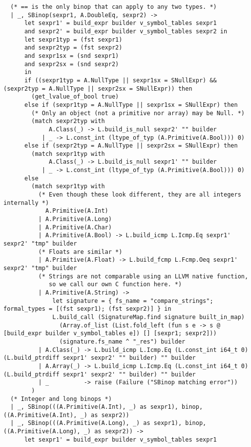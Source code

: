\documentclass{article}
\begin{document}
\begin{verbatim}
  (* == is the only binop that can apply to any two types. *)
  | _, SBinop(sexpr1, A.DoubleEq, sexpr2) ->
      let sexpr1' = build_expr builder v_symbol_tables sexpr1
      and sexpr2' = build_expr builder v_symbol_tables sexpr2 in
      let sexpr1typ = (fst sexpr1)
      and sexpr2typ = (fst sexpr2)
      and sexpr1sx = (snd sexpr1)
      and sexpr2sx = (snd sexpr2)
      in
      if ((sexpr1typ = A.NullType || sexpr1sx = SNullExpr) && (sexpr2typ = A.NullType || sexpr2sx = SNullExpr)) then
        (get_lvalue_of_bool true)
      else if (sexpr1typ = A.NullType || sexpr1sx = SNullExpr) then
        (* Only an object (not a primitive nor array) may be Null. *)
        (match sexpr2typ with
             A.Class(_) -> L.build_is_null sexpr2' "" builder
           | _ -> L.const_int (ltype_of_typ (A.Primitive(A.Bool))) 0)
      else if (sexpr2typ = A.NullType || sexpr2sx = SNullExpr) then
        (match sexpr1typ with
             A.Class(_) -> L.build_is_null sexpr1' "" builder
           | _ -> L.const_int (ltype_of_typ (A.Primitive(A.Bool))) 0)
      else
        (match sexpr1typ with
          (* Even though these look different, they are all integers internally *)
            A.Primitive(A.Int)
          | A.Primitive(A.Long)
          | A.Primitive(A.Char)
          | A.Primitive(A.Bool) -> L.build_icmp L.Icmp.Eq sexpr1' sexpr2' "tmp" builder
          (* Floats are similar *)
          | A.Primitive(A.Float) -> L.build_fcmp L.Fcmp.Oeq sexpr1' sexpr2' "tmp" builder
          (* Strings are not comparable using an LLVM native function,
             so we call our own C function here. *)
          | A.Primitive(A.String) ->
              let signature = { fs_name = "compare_strings"; formal_types = [(fst sexpr1); (fst sexpr2)] } in
              L.build_call (SignatureMap.find signature built_in_map)
                (Array.of_list (List.fold_left (fun s e -> s @ [build_expr builder v_symbol_tables e]) [] [sexpr1; sexpr2]))
                (signature.fs_name ^ "_res") builder
          | A.Class(_) -> L.build_icmp L.Icmp.Eq (L.const_int i64_t 0) (L.build_ptrdiff sexpr1' sexpr2' "" builder) "" builder
          | A.Array(_) -> L.build_icmp L.Icmp.Eq (L.const_int i64_t 0) (L.build_ptrdiff sexpr1' sexpr2' "" builder) "" builder
          | _          -> raise (Failure ("SBinop matching error"))
        )
  (* Integer and long binops *)
  | _, SBinop(((A.Primitive(A.Int), _) as sexpr1), binop, ((A.Primitive(A.Int), _) as sexpr2))
  | _, SBinop(((A.Primitive(A.Long), _) as sexpr1), binop, ((A.Primitive(A.Long), _) as sexpr2)) ->
      let sexpr1' = build_expr builder v_symbol_tables sexpr1

\end{verbatim}
\end{document}
